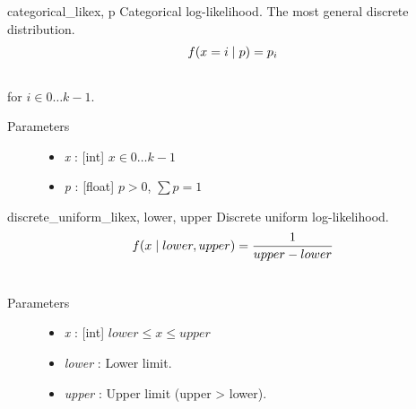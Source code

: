 \hypertarget{pymc.distributions.categorical_like}{}\begin{funcdesc}{categorical\_like}{x, p}
Categorical log-likelihood. The most general discrete distribution.
\begin{gather}
\begin{split}f(x=i \mid p) = p_i\end{split}\notag\\\begin{split}\end{split}\notag
\end{gather}
for $i \in 0 \ldots k-1$.
\begin{description}
\item[Parameters] \leavevmode\begin{itemize}
\item {} 
\emph{x} : {[}int{]} $x \in 0\ldots k-1$

\item {} 
\emph{p} : {[}float{]} $p > 0$, $\sum p = 1$

\end{itemize}

\end{description}
\end{funcdesc}

\hypertarget{pymc.distributions.discrete_uniform_like}{}\begin{funcdesc}{discrete\_uniform\_like}{x, lower, upper}
Discrete uniform log-likelihood.
\begin{gather}
\begin{split}f(x \mid lower, upper) = \frac{1}{upper-lower}\end{split}\notag\\\begin{split}\end{split}\notag
\end{gather}\begin{description}
\item[Parameters] \leavevmode\begin{itemize}
\item {} 
\emph{x} : {[}int{]} $lower \leq x \leq upper$

\item {} 
\emph{lower} : Lower limit.

\item {} 
\emph{upper} : Upper limit (upper \textgreater{} lower).

\end{itemize}

\end{description}
\end{funcdesc}

